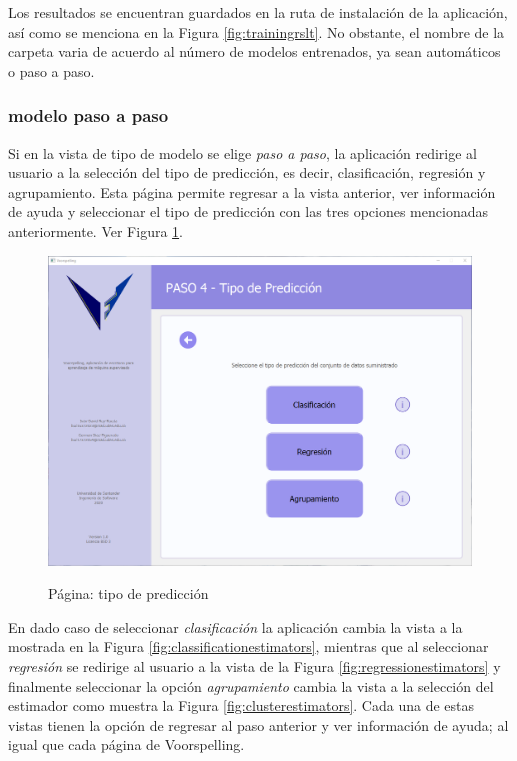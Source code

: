Los resultados se encuentran guardados en la ruta de instalación de la aplicación, así como se menciona en la Figura \ref{fig:trainingrslt}. No obstante, el nombre de la carpeta varia de acuerdo al número de modelos entrenados, ya sean automáticos o paso a paso.

\subsubsection{modelo paso a paso}

Si en la vista de tipo de modelo se elige \textit{paso a paso}, la aplicación redirige al usuario a la selección del tipo de predicción, es decir, clasificación, regresión y agrupamiento. Esta página permite regresar a la vista anterior, ver información de ayuda y seleccionar el tipo de predicción con las tres opciones mencionadas anteriormente. Ver Figura \ref{fig:predictiontype}.

\begin{figure}[H]
    \centering
    \caption{Página: tipo de predicción}
    \includegraphics[width=\textwidth]{images/predictiontype.png}
    \label{fig:predictiontype}
\end{figure}

En dado caso de seleccionar \textit{clasificación} la aplicación cambia la vista a la mostrada en la Figura \ref{fig:classificationestimators}, mientras que al seleccionar \textit{regresión} se redirige al usuario a la vista de la Figura \ref{fig:regressionestimators} y finalmente seleccionar la opción \textit{agrupamiento} cambia la vista a la selección del estimador como muestra la Figura \ref{fig:clusterestimators}. Cada una de estas vistas tienen la opción de regresar al paso anterior y ver información de ayuda; al igual que cada página de Voorspelling.

